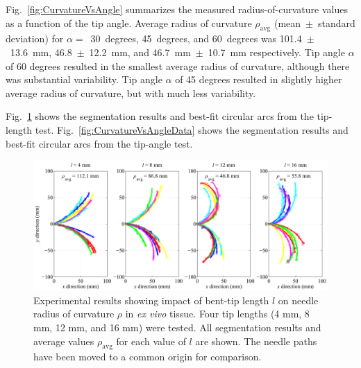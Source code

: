 Fig.~\ref{fig:CurvatureVsAngle} summarizes the measured radius-of-curvature values as a function of the tip angle. Average radius of curvature $\rho_{\text{avg}}$ (mean~$\pm$~standard deviation) for $\alpha =$~30~degrees, 45~degrees, and 60~degrees was 101.4~$\pm$~13.6~mm, 46.8~$\pm$~12.2~mm, and 46.7~mm~$\pm$~10.7~mm respectively. Tip angle $\alpha$ of 60 degrees resulted in the smallest average radius of curvature, although there was substantial variability. Tip angle $\alpha$ of 45 degrees resulted in slightly higher average radius of curvature, but with much less variability.

Fig.~\ref{fig:CurvatureVsLengthData} shows the segmentation results and best-fit circular arcs from the tip-length test. Fig.~\ref{fig:CurvatureVsAngleData} shows the segmentation results and best-fit circular arcs from the tip-angle test.  

\begin{figure}[!t]
\centering
\includegraphics[width=\textwidth]{Images/Chapter3/CurvatureVsLength/CurvatureVsLengthData}%
\caption[Experimental results showing impact of bent-tip length]{Experimental results showing impact of bent-tip length $l$ on needle radius of curvature $\rho$ in \textit{ex vivo} tissue. Four tip lengths (4 mm, 8 mm, 12 mm, and 16 mm) were tested. All segmentation results and average values $\rho_{\text{avg}}$ for each value of $l$ are shown. The needle paths have been moved to a common origin for comparison.}
\label{fig:CurvatureVsLengthData}
\end{figure}

